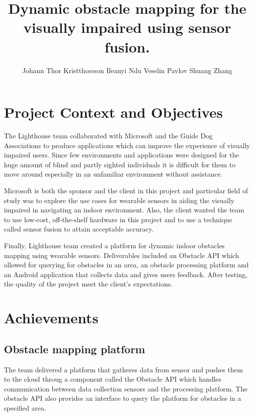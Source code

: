 \documentclass[prodmode,acmtosem]{acmsmall} %
\begin{document}

\title{Dynamic obstacle mapping for the visually impaired using sensor fusion.}
\author{Johann Thor Kristthorsson
Ifeanyi Ndu
Veselin Pavlov
Shuang Zhang
}
\maketitle

\section{Project Context and Objectives}
The Lighthouse team collaborated with Microsoft and the Guide Dog Associations to produce applications which can improve the experience of visually impaired users. Since few environments and applications were designed for the huge amount of blind and partly sighted individuals it is difficult for them to move around especially in an unfamiliar environment without assistance. 

Microsoft is both the sponsor and the client in this project and particular field of study was to explore the use cases for wearable sensors in aiding the visually impaired in navigating an indoor environment. Also, the client wanted the team to use low-cost, off-the-shelf hardware in this project and to use a technique called sensor fusion to attain acceptable accuracy.

Finally, Lighthouse team created a platform for dynamic indoor obstacles mapping using wearable sensors. Deliverables included an Obstacle API which allowed for querying for obstacles in an area, an obstacle processing platform and an Android application that collects data and gives users feedback. After testing, the quality of the project meet the client's expectations.

\section{Achievements}
\subsection{Obstacle mapping platform}
The team delivered a platform that gatheres data from sensor and pushes them to the cloud throug a component called the Obstacle API which handles communication between data collection sensors and the processing platform. The obstacle API also provides an interface to query the platform for obstacles in a specified area. 
\end{document}
